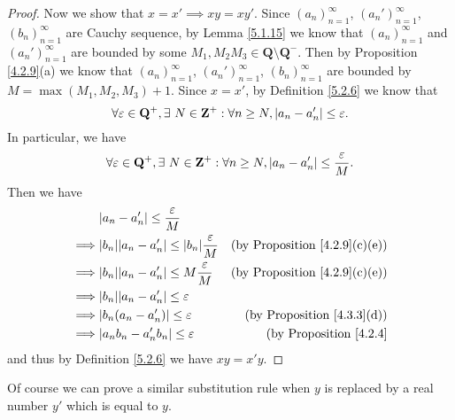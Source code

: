 \begin{proof}
    Now we show that \(x = x' \implies xy = xy'\).
    Since \((a_n)_{n = 1}^\infty\), \((a_n')_{n = 1}^\infty\), \((b_n)_{n = 1}^\infty\) are Cauchy sequence, by Lemma \ref{5.1.15} we know that \((a_n)_{n = 1}^\infty\) and \((a_n')_{n = 1}^\infty\) are bounded by some \(M_1, M_2 M_3 \in \mathbf{Q} \setminus \mathbf{Q}^-\).
    Then by Proposition \ref{4.2.9}(a) we know that \((a_n)_{n = 1}^\infty\), \((a_n')_{n = 1}^\infty\), \((b_n)_{n = 1}^\infty\) are bounded by \(M = \max(M_1, M_2, M_3) + 1\).
    Since \(x = x'\), by Definition \ref{5.2.6} we know that
    \[
        \forall \varepsilon \in \mathbf{Q}^+, \exists\ N \in \mathbf{Z}^+ : \forall n \geq N, \abs*{a_n - a_n'} \leq \varepsilon.
    \]
    In particular, we have
    \[
        \forall \varepsilon \in \mathbf{Q}^+, \exists\ N \in \mathbf{Z}^+ : \forall n \geq N, \abs*{a_n - a_n'} \leq \frac{\varepsilon}{M}.
    \]
    Then we have
    \begin{align*}
                 & \abs*{a_n - a_n'} \leq \frac{\varepsilon}{M}                                                                   \\
        \implies & \abs*{b_n} \abs*{a_n - a_n'} \leq \abs*{b_n} \frac{\varepsilon}{M} & \text{(by Proposition \ref{4.2.9}(c)(e))} \\
        \implies & \abs*{b_n} \abs*{a_n - a_n'} \leq M \frac{\varepsilon}{M}          & \text{(by Proposition \ref{4.2.9}(c)(e))} \\
        \implies & \abs*{b_n} \abs*{a_n - a_n'} \leq \varepsilon                                                                  \\
        \implies & \abs*{b_n (a_n - a_n')} \leq \varepsilon                           & \text{(by Proposition \ref{4.3.3}(d))}    \\
        \implies & \abs*{a_n b_n - a_n' b_n} \leq \varepsilon                         & \text{(by Proposition \ref{4.2.4}}
    \end{align*}
    and thus by Definition \ref{5.2.6} we have \(xy = x'y\).
\end{proof}

\begin{note}
    Of course we can prove a similar substitution rule when \(y\) is replaced by a real number \(y'\) which is equal to \(y\).
\end{note}

